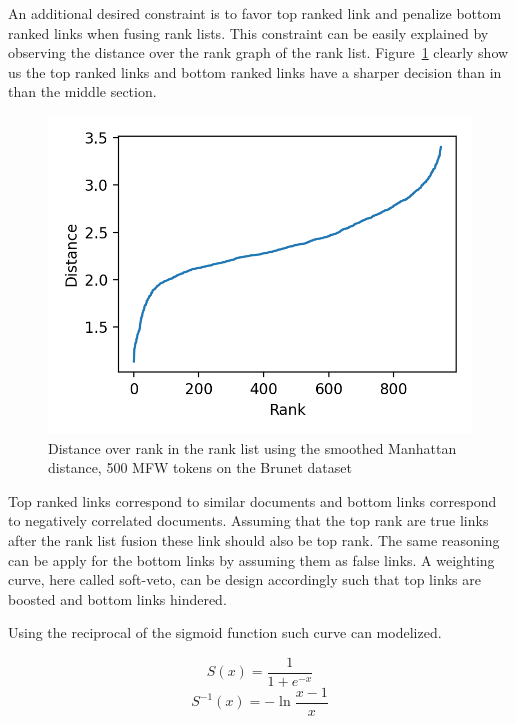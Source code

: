 An additional desired constraint is to favor top ranked link and penalize bottom ranked links when fusing rank lists.
This constraint can be easily explained by observing the distance over the rank graph of the rank list.
Figure~\ref{fig:distance_over_rank} clearly show us the top ranked links and bottom ranked links have a sharper decision than in than the middle section.

\begin{figure}
  \centering
  \caption{Distance over rank in the rank list using the smoothed Manhattan distance, 500 MFW tokens on the Brunet dataset}
  \label{fig:distance_over_rank}
  \includegraphics[width=\linewidth]{img/distance_over_rank.png}
\end{figure}

Top ranked links correspond to similar documents and bottom links correspond to negatively correlated documents.
Assuming that the top rank are true links after the rank list fusion these link should also be top rank.
The same reasoning can be apply for the bottom links by assuming them as false links.
A weighting curve, here called soft-veto, can be design accordingly such that top links are boosted and bottom links hindered.

Using the reciprocal of the sigmoid function such curve can modelized.

\begin{equation}
  \label{eq:sigmoid}
  S(x) = \frac{1}{1+e^{-x}}
\end{equation}
\begin{equation}
  \label{eq:sigmoid_r}
  S^{-1}(x) = -\ln{\frac{x-1}{x}}
\end{equation}

